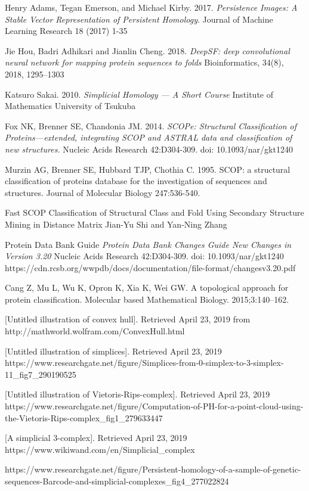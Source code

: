 \documentclass[12pt, a4paper, twocolumn, fullpage]{article}
\theoremstyle{plain}
\theoremstyle{definition}
\theoremstyle{remark}
\begin{document}
\pagebreak
\pagebreak
\begin{thebibliography}{9}
Henry Adams, Tegan Emerson, and Michael Kirby. 
2017.
\textit{Persistence Images: A Stable Vector Representation of
Persistent Homology}. 
Journal of Machine Learning Research 18 (2017) 1-35

Jie Hou, Badri Adhikari and Jianlin Cheng.
2018.
\textit{DeepSF: deep convolutional neural network for mapping protein sequences to folds}
Bioinformatics, 34(8), 2018, 1295–1303

Katsuro Sakai.
2010.
\textit{Simplicial Homology — A Short Course}
Institute of Mathematics University of Tsukuba

Fox NK, Brenner SE, Chandonia JM.
2014.
\textit{SCOPe: Structural Classification of Proteins—extended, integrating SCOP and ASTRAL data and classification of new structures.}
Nucleic Acids Research 42:D304-309. doi: 10.1093/nar/gkt1240

Murzin AG, Brenner SE, Hubbard TJP, Chothia C. 1995. SCOP: a structural classification of proteins database for the investigation of sequences and structures. Journal of Molecular Biology 247:536-540.

Fast SCOP Classification of Structural Class and Fold Using Secondary
Structure Mining in Distance Matrix
Jian-Yu Shi and Yan-Ning Zhang

Protein Data Bank Guide
\textit{Protein Data Bank Changes Guide
    New Changes in Version 3.20}
Nucleic Acids Research 42:D304-309. doi: 10.1093/nar/gkt1240
https://cdn.rcsb.org/wwpdb/docs/documentation/file-format/changesv3.20.pdf

Cang Z, Mu L, Wu K, Opron K, Xia K, Wei GW. A topological approach for protein classification. Molecular based Mathematical Biology. 2015;3:140–162.


[Untitled illustration of convex hull]. Retrieved April 23, 2019
             from http://mathworld.wolfram.com/ConvexHull.html
             
[Untitled illustration of simplices]. Retrieved April 23, 2019
https://www.researchgate.net/figure/Simplices-from-0-simplex-to-3-simplex-11\_fig7\_290190525

[Untitled illustration of Vietoris-Rips-complex]. Retrieved April 23, 2019
https://www.researchgate.net/figure/Computation-of-PH-for-a-point-cloud-using-the-Vietoris-Rips-complex\_fig1\_279633447

[A simplicial 3-complex]. Retrieved April 23, 2019 https://www.wikiwand.com/en/Simplicial\_complex

https://www.researchgate.net/figure/Persistent-homology-of-a-sample-of-genetic-sequences-Barcode-and-simplicial-complexes\_fig4\_277022824
\end{thebibliography}
\end{document}
